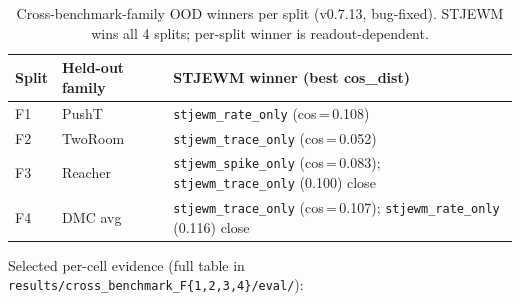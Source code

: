 \documentclass{article}
\begin{document}
\begin{table}[ht]
\centering
\small
\begin{tabular}{lll}
\toprule
Split & Held-out family & STJEWM winner (best cos\_dist) \\
\midrule
F1 & PushT & \texttt{stjewm\_rate\_only} (cos\,=\,0.108) \\
F2 & TwoRoom & \texttt{stjewm\_trace\_only} (cos\,=\,0.052) \\
F3 & Reacher & \texttt{stjewm\_spike\_only} (cos\,=\,0.083); \texttt{stjewm\_trace\_only} (0.100) close \\
F4 & DMC avg & \texttt{stjewm\_trace\_only} (cos\,=\,0.107); \texttt{stjewm\_rate\_only} (0.116) close \\
\bottomrule
\end{tabular}
\caption{Cross-benchmark-family OOD winners per split (v0.7.13, bug-fixed). STJEWM wins all 4 splits; per-split winner is readout-dependent.}
\label{tab:crossbench-winners}
\end{table}

Selected per-cell evidence (full table in \texttt{results/cross\_benchmark\_F\{1,2,3,4\}/eval/}):
\end{document}
